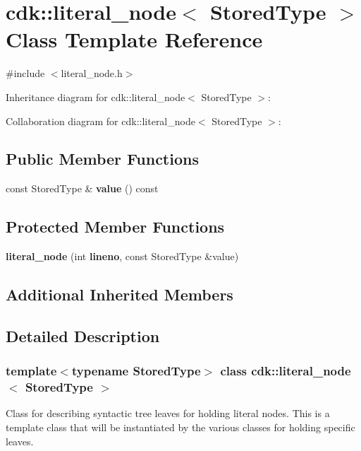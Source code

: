 \section{cdk\+:\+:literal\+\_\+node$<$ Stored\+Type $>$ Class Template Reference}
\label{classcdk_1_1literal__node}


{\ttfamily \#include $<$literal\+\_\+node.\+h$>$}



Inheritance diagram for cdk\+:\+:literal\+\_\+node$<$ Stored\+Type $>$\+:


Collaboration diagram for cdk\+:\+:literal\+\_\+node$<$ Stored\+Type $>$\+:
\subsection*{Public Member Functions}
\begin{DoxyCompactItemize}
\item 
\mbox{\label{classcdk_1_1literal__node_a2285a40a719019c68a379950ddc9ffc9}} 
const Stored\+Type \& {\bfseries value} () const
\end{DoxyCompactItemize}
\subsection*{Protected Member Functions}
\begin{DoxyCompactItemize}
\item 
\mbox{\label{classcdk_1_1literal__node_aa75409de8595d4073ca995f988210ae8}} 
{\bfseries literal\+\_\+node} (int \textbf{ lineno}, const Stored\+Type \&value)
\end{DoxyCompactItemize}
\subsection*{Additional Inherited Members}


\subsection{Detailed Description}
\subsubsection*{template$<$typename Stored\+Type$>$\newline
class cdk\+::literal\+\_\+node$<$ Stored\+Type $>$}

Class for describing syntactic tree leaves for holding literal nodes. This is a template class that will be instantiated by the various classes for holding specific leaves.


